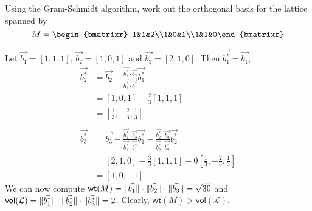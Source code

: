 \documentclass[11pt]{article}
\begin{document}
\begin{prob}{8.5}Using the Gram-Schmidt algorithm, work out the orthogonal basis for the lattice spanned by
\begin{equation*}
  M=\begin{bmatrixr}{3}1&1&2\\1&0&1\\1&1&0\end{bmatrixr}
\end{equation*}
\end{prob}
\begin{sol} Let $\vec{b_1}=[1,1,1]$, $\vec{b_2}=[1,0,1]$ and $\vec{b_3}=[2,1,0]$. Then $\vec{b_1^*}=\vec{b_1}$,
  \begin{align*}
    \vec{b_2^*} &= \vec{b_2}-\frac{\vec{b_1^*}\cdot \vec{b_2}}{\vec{b_1^*} \cdot \vec{b_1^*}}\vec{b_1^*}\\
      &= [1,0,1] - \tfrac{2}{3}[1,1,1]\\
      &= [\tfrac{1}{3}, -\tfrac{2}{3}, \tfrac{1}{3}]\\&\\
    \vec{b_3^*} &= \vec{b_3}-\frac{\vec{b_1^*}\cdot \vec{b_3}}{\vec{b_1^*} \cdot \vec{b_1^*}}\vec{b_1^*} - \frac{\vec{b_2^*}\cdot \vec{b_3}}{\vec{b_2^*} \cdot \vec{b_2^*}}\vec{b_2^*}\\
      &= [2,1,0] - \tfrac{3}{3}[1,1,1] - 0[\tfrac{1}{3}, -\tfrac{2}{3}, \tfrac{1}{3}]\\
      &= [1,0,-1]
  \end{align*}
  We can now compute $\mathsf{wt}(M)=\lVert \vec{b_1} \rVert\cdot\lVert \vec{b_2} \rVert\cdot\lVert \vec{b_3} \rVert=\sqrt{30}$ and $\mathsf{vol}({\mathcal{L}})=\lVert \vec{b_1^*} \rVert\cdot\lVert \vec{b_2^*} \rVert\cdot\lVert \vec{b_3^*} \rVert=2$. Clearly, $\mathsf{wt}(M)>\mathsf{vol}(\mathcal{L})$.
\end{sol}
\end{document}

